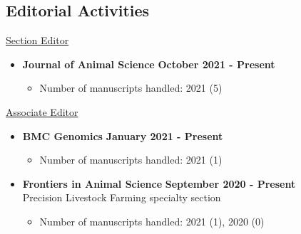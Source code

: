 \documentclass[margin,line,10pt]{res}
\begin{document}
\begin{resume}
\vspace{0.5cm}
\section{\sc Editorial Activities}


\underline{Section Editor}
\vspace{0.2cm}

\begin{itemize}
\item {\bf Journal of Animal Science} \hfill {\bf October 2021 - Present}
  \begin{itemize}
    \item Number of manuscripts handled: 2021 (5)
  \end{itemize}
\end{itemize}


\underline{Associate Editor}
\vspace{0.2cm}



\begin{itemize}
\item {\bf BMC Genomics} \hfill {\bf January 2021 - Present}
  \begin{itemize}
    \item Number of manuscripts handled: 2021 (1)
  \end{itemize}
\end{itemize}

\vspace{0.3cm}

\begin{itemize}
\item {\bf Frontiers in Animal Science} \hfill {\bf September 2020 - Present} \\
   Precision Livestock Farming specialty section
  \begin{itemize}
    \item Number of manuscripts handled: 2021 (1), 2020 (0)
  \end{itemize}
\end{itemize}


\end{resume}
\end{document}
